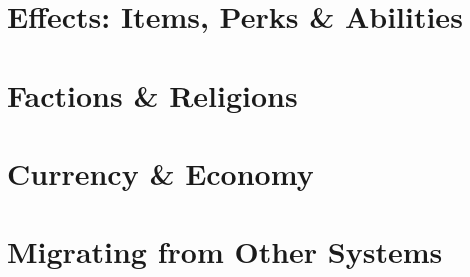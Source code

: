 \section{Effects: Items, Perks \& Abilities}



\section{Factions \& Religions}


\section{Currency \& Economy}


\section{Migrating from Other Systems}



